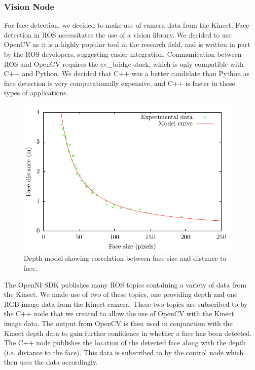 \documentclass[conference]{IEEEtran}
\begin{document}
\subsubsection{Vision Node}
For face detection, we decided to make use of camera data from the Kinect. Face detection in ROS necessitates the use of a vision library. We decided to use OpenCV as it is a highly popular tool in the research field, and is written in part by the ROS developers, suggesting easier integration. Communication between ROS and OpenCV requires the cv\_bridge stack, which is only compatible with C++ and Python. We decided that C++ was a better candidate than Python as face detection is very computationally expensive, and C++ is faster in these types of applications.
\begin{figure}
  \includegraphics[width=\columnwidth]{centre_model}
  \caption{Depth model showing correlation between face size and distance to face.}
  \label{fig:model}
\end{figure}
The OpenNI SDK publishes many ROS topics containing a variety of data from the Kinect. We made use of two of these topics, one providing depth and one RGB image data from the Kinect camera. These two topics are subscribed to by the C++ node that we created to allow the use of OpenCV with the Kinect image data. The output from OpenCV is then used in conjunction with the Kinect depth data to gain further confidence in whether a face has been detected. The C++ node publishes the location of the detected face along with the depth (i.e. distance to the face). This data is subscribed to by the control node which then uses the data accordingly.
\end{document}
